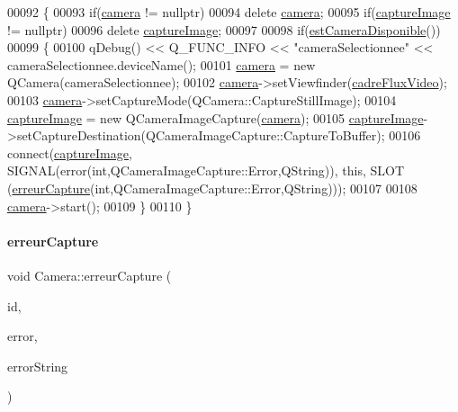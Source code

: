 \begin{DoxyCode}
00092 \{
00093     \textcolor{keywordflow}{if}(\hyperlink{class_camera_a282a199ddd33fe64bc27b32a55719054}{camera} != \textcolor{keyword}{nullptr})
00094         \textcolor{keyword}{delete} \hyperlink{class_camera_a282a199ddd33fe64bc27b32a55719054}{camera};
00095     \textcolor{keywordflow}{if}(\hyperlink{class_camera_a482276c4fd0ba7172670006556322b62}{captureImage} != \textcolor{keyword}{nullptr})
00096         \textcolor{keyword}{delete} \hyperlink{class_camera_a482276c4fd0ba7172670006556322b62}{captureImage};
00097 
00098     \textcolor{keywordflow}{if}(\hyperlink{class_camera_afb73ab859802a143a1a00443e396143e}{estCameraDisponible}())
00099     \{
00100         qDebug() << Q\_FUNC\_INFO << \textcolor{stringliteral}{"cameraSelectionnee"} << cameraSelectionnee.deviceName();
00101         \hyperlink{class_camera_a282a199ddd33fe64bc27b32a55719054}{camera} = \textcolor{keyword}{new} QCamera(cameraSelectionnee);
00102         \hyperlink{class_camera_a282a199ddd33fe64bc27b32a55719054}{camera}->setViewfinder(\hyperlink{class_camera_abf5fd38d19f0f06dfd7ec9e37f73adb8}{cadreFluxVideo});
00103         \hyperlink{class_camera_a282a199ddd33fe64bc27b32a55719054}{camera}->setCaptureMode(QCamera::CaptureStillImage);
00104         \hyperlink{class_camera_a482276c4fd0ba7172670006556322b62}{captureImage} = \textcolor{keyword}{new} QCameraImageCapture(\hyperlink{class_camera_a282a199ddd33fe64bc27b32a55719054}{camera});
00105         \hyperlink{class_camera_a482276c4fd0ba7172670006556322b62}{captureImage}->setCaptureDestination(QCameraImageCapture::CaptureToBuffer);
00106         connect(\hyperlink{class_camera_a482276c4fd0ba7172670006556322b62}{captureImage}, SIGNAL(error(\textcolor{keywordtype}{int},QCameraImageCapture::Error,QString)), \textcolor{keyword}{this}, SLOT
      (\hyperlink{class_camera_ac5b8c16f8edcb92569fab87185fc0500}{erreurCapture}(\textcolor{keywordtype}{int},QCameraImageCapture::Error,QString)));
00107 
00108         \hyperlink{class_camera_a282a199ddd33fe64bc27b32a55719054}{camera}->start();
00109     \}
00110 \}
\end{DoxyCode}
\mbox{\label{class_camera_ac5b8c16f8edcb92569fab87185fc0500}} 
\paragraph{\texorpdfstring{erreur\+Capture}{erreurCapture}}
{\footnotesize\ttfamily void Camera\+::erreur\+Capture (\begin{DoxyParamCaption}\item[{int}]{id,  }\item[{Q\+Camera\+Image\+Capture\+::\+Error}]{error,  }\item[{const Q\+String \&}]{error\+String }\end{DoxyParamCaption})\hspace{0.3cm}{\ttfamily [slot]}}




